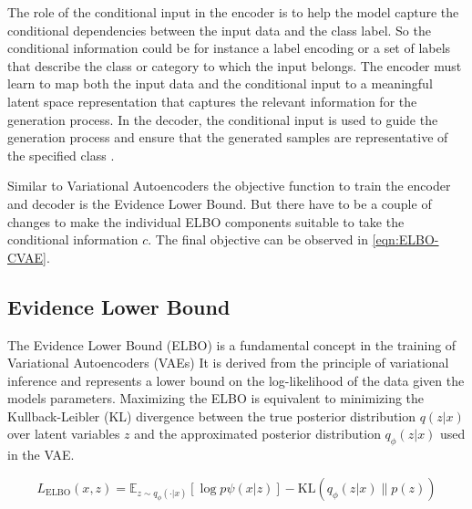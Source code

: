 The role of the conditional input in the encoder is to help the model capture the conditional dependencies between the input data and the class label. So the conditional information could be for instance a label encoding or a set of labels that describe the class or category to which the input belongs. The encoder must learn to map both the input data and the conditional input to a meaningful latent space representation that captures the relevant information for the generation process. In the decoder, the conditional input is used to guide the generation process and ensure that the generated samples are representative of the specified class \cite{CVAE}.

Similar to Variational Autoencoders the objective function to train the encoder and decoder is the Evidence Lower Bound. But there have to be a couple of changes to make the individual ELBO components suitable to take the conditional information $c$. The final objective can be observed in \eqref{eqn:ELBO-CVAE}.

\subsection{Evidence Lower Bound}\label{sec:ELBO}

The Evidence Lower Bound \cite{pml2Book} (ELBO) is a fundamental concept in the training of Variational Autoencoders (VAEs)
It is derived from the principle of variational inference and represents a lower bound on the log-likelihood of the data given the models parameters. Maximizing the ELBO is equivalent to minimizing the Kullback-Leibler (KL) divergence \cite{pml2Book} between the true posterior distribution $q(z|x)$ over latent variables $z$ and the approximated posterior distribution $q_\phi(z|x)$ used in the VAE.

\begin{equation}\label{eqn:ELBO}
	L_\text{ELBO}(x, z) = \mathbb{E}_{z\sim q_\phi(\cdot|x)} \left[ \log p\psi(x|z) \right] - \text{KL}\left( q_\phi(z|x) \| p(z) \right)
\end{equation}

